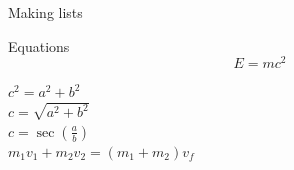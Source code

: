\documentclass{refman}
\begin{document}
\begin{section}{Making lists}
\begin{subsection}{Equations}
    \begin{equation}
      E = m c^2
    \end{equation}

    $ c^2 = a^2 + b^2$ \\
    $ c = \sqrt{a^2 + b^2}$ \\
    $ c = \sec(\frac{a}{b})$ \\

    $m_1 v_1 + m_2 v_2 = (m_1 + m_2) v_f$ \\

  \end{subsection}

\end{section}

\end{document}
